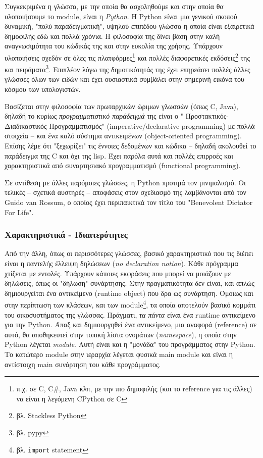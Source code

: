 Συγκεκριμένα η γλώσσα, με την οποία θα ασχοληθούμε και στην οποία θα
υλοποιήσουμε το module, είναι η \textit{Python}\cite{python}. Η Python είναι μια
γενικού σκοπού δυναμική, "πολύ-παραδειγματική", υψηλού επιπέδου γλώσσα η οποία
είναι εξαιρετικά δημοφιλής εδώ και πολλά χρόνια. Η φιλοσοφία της δίνει βάση στην
καλή αναγνωσιμότητα του κώδικάς της και στην ευκολία της χρήσης. Υπάρχουν
υλοποιήσεις σχεδόν σε όλες τις  πλατφόρμες\footnote{π.χ. σε C, C\#, Java κλπ, με
την πιο δημοφιλής (και το reference για τις άλλες) να είναι η λεγόμενη CPython
σε C} και πολλές διαφορετικές εκδόσεις\footnote{βλ. Stackless Python} της και
πειράματα\footnote{βλ. pypy}. Επιπλέον λόγω της δημοτικότητάς της έχει επηρεάσει
πολλές άλλες γλώσσες όλων των ειδών και έχει ουσιαστικά συμβάλει στην σημερινή
εικόνα του κόσμου των υπολογιστών.

Βασίζεται στην φιλοσοφία των πρωταρχικών ώριμων γλωσσών (όπως C, Java), δηλαδή
το κυρίως \textit{προγραμματιστικό παράδειγμά} της είναι ο "
Προστακτικός-Διαδικαστικός Προγραμματισμός" (imperative/declarative
programming) με πολλά στοιχεία – και ένα καλό σύστημα αντικειμένων
(object-oriented programming). Επίσης λέμε ότι "ξεχωρίζει" τις έννοιες
δεδομένων και κώδικα – δηλαδή ακολουθεί το παράδειγμα της C και όχι της lisp.
Έχει παρόλα αυτά και πολλές επιρροές και χαρακτηριστικά από συναρτησιακό
προγραμματισμό (functional programming).

Σε αντίθεση με άλλες παρόμοιες γλώσσες, η Python προτιμά τον μινιμαλισμό. Οι
τελικές – σχετικά αυστηρές – αποφάσεις στον σχεδιασμό της λαμβάνονται από τον
Guido van Rossum, ο οποίος έχει περιπαικτικά τον τίτλο του "Benevolent Dictator
For Life".\cite{guido}

\subsubsection{Χαρακτηριστικά - Ιδιαιτερότητες}

Από την άλλη, όπως οι περισσότερες γλώσσες, βασικό χαρακτηριστικό που τις διέπει
είναι η παντελής έλλειψη δηλώσεων (\textit{no declaration notion}). Κάθε
πρόγραμμα χτίζεται με εντολές. Υπάρχουν κάποιες εκφράσεις που μπορεί να μοιάζουν
με δηλώσεις, όπως οι "δήλωση" συνάρτησης. Στην πραγματικότητα δεν είναι, και
απλώς δημιουργείται ένα αντικείμενο (runtime object) που δρα ως συνάρτηση.
Όμοιως και στην περίπτωση των κλάσεων, και των module\footnote{βλ.
\texttt{import} statement}, τα οποία αποτελούν βασικό κομμάτι του οικοσυστήματος
της γλώσσας. Πράγματι, \textit{τα πάντα} είναι ένα runtime αντικείμενο για την
Python. Άπαξ και δημιουργηθεί ένα αντικείμενο, μια αναφορά (reference) σε αυτό,
θα αποθηκευτεί στην τοπική λίστα ονομάτων (\textit{namespace}), η οποία στην
Python λέγεται \textit{module}. Αυτή είναι και η "μονάδα" του προγράμματος στην
Python. Το κατώτερο module στην ιεραρχία λέγεται φυσικά main module και είναι η
αντίστοιχη main συνάρτηση του κάθε προγράμματος.

